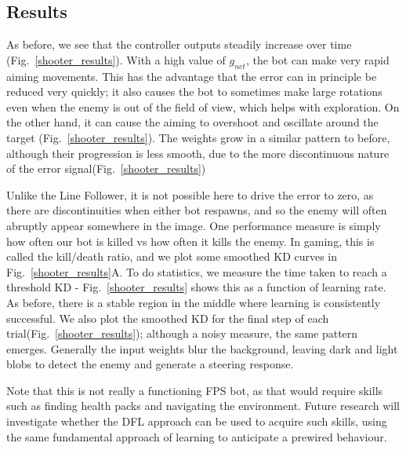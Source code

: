 \documentclass{llncs}
\begin{document}
\subsection{Results}

As before, we see that the controller outputs steadily increase over time (Fig.~\ref{shooter_results}). With a high value of $g_{net}$, the bot can make very rapid aiming movements. This has the advantage that the error can in principle be reduced very quickly; it also causes the bot to sometimes make large rotations even when the enemy is out of the field of view, which helps with exploration. On the other hand, it can cause the aiming to overshoot and oscillate around the target (Fig.~\ref{shooter_results}). 
The weights grow in a similar pattern to before, although their progression is less smooth, due to the more discontinuous nature of the error signal(Fig.~\ref{shooter_results})

Unlike the Line Follower, it is not possible here to drive the error to zero, as there are discontinuities when either bot respawns, and so the enemy will often abruptly appear somewhere in the image. One performance measure is simply how often our bot is killed vs how often it kills the enemy. In gaming, this is called the kill/death ratio, and we plot some smoothed KD curves in Fig.~\ref{shooter_results}A. To do statistics, we measure the time taken to reach a threshold KD - Fig.~\ref{shooter_results} shows this as a function of learning rate. As before, there is a stable region in the middle where learning is consistently successful. We also plot the smoothed KD for the final step of each trial(Fig.~\ref{shooter_results}); although a noisy measure, the same pattern emerges. Generally the input weights blur the background, leaving dark and light blobs to detect the enemy and generate a steering response. 

Note that this is not really a functioning FPS bot, as that would require skills such as finding health packs and navigating the environment. Future research will investigate whether the DFL approach can be used to acquire such skills, using the same fundamental approach of learning to anticipate a prewired behaviour. 
\end{document}
